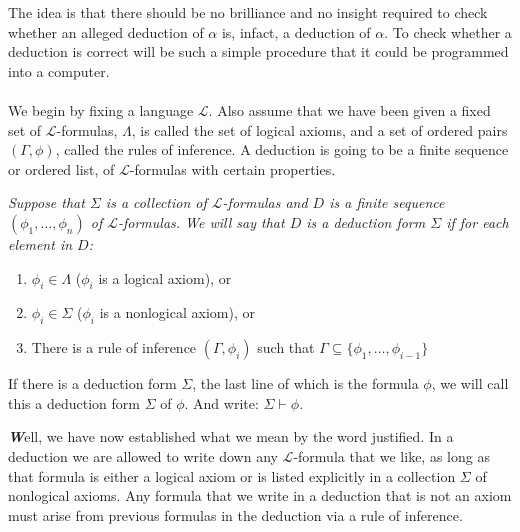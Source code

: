 \documentclass[10pt,a4paper]{article}
\newenvironment{callout}
	{\begin{calloutbox}\color{charcoal}\textbf\textit}
	{\end{calloutbox}}
\newcommand{\curveL}{\mathcal{L}}
\begin{document}
                    The idea is that there should be no brilliance and no insight required to check whether an alleged deduction of $\alpha$ is, infact, a deduction of $\alpha$. To check whether a deduction is correct will be such a simple procedure that it could be programmed into a computer.
                    \\
                    \\
                    We begin by fixing a language $\curveL$. Also assume that we have been given a fixed set of $\curveL$-formulas, $\Lambda$, is called the set of logical axioms, and a set of ordered pairs $(\Gamma, \phi)$, called the rules of inference. A deduction is going to be a finite sequence or ordered list, of $\curveL$-formulas with certain properties.
                    \begin{define}
                        \textit{Suppose that $\Sigma$ is a collection of $\curveL$-formulas and $D$ is a finite sequence $(\phi_1, \dots, \phi_n)$ of $\curveL$-formulas. We will say that $D$ is a deduction form $\Sigma$ if for each element in $D$:}
                        \begin{enumerate}
                            \item $\phi_i\in\Lambda$ ($\phi_i$ is a logical axiom), or
                            \item $\phi_i\in\Sigma$ ($\phi_i$ is a nonlogical axiom), or
                            \item There is a rule of inference $(\Gamma,\phi_i)$ such that $\Gamma\subseteq\{\phi_1,\dots,\phi_{i-1}\}$
                        \end{enumerate}
                    \end{define}
                        If there is a deduction form $\Sigma$, the last line of which is the formula $\phi$, we will call this a deduction form $\Sigma$ of $\phi$. And write: $\Sigma\vdash\phi$.
                        \begin{callout}
                            Well, we have now established what we mean by the word justified. In a deduction we are allowed to write down any $\curveL$-formula that we like, as long as that formula is either a logical axiom or is listed explicitly in a collection $\Sigma$ of nonlogical axioms. Any formula that we write in a deduction that is not an axiom must arise from previous formulas in the deduction via a rule of inference.
                        \end{callout}
\end{document}

